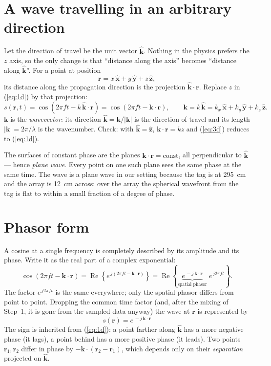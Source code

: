 \documentclass[11pt,a4paper]{article}
\newcommand{\vect}[1]{\mathbf{#1}}
\newcommand{\uv}[1]{\hat{\mathbf{#1}}}
\begin{document}
\section{A wave travelling in an arbitrary direction}
Let the direction of travel be the unit vector $\uv k$. Nothing in the physics prefers the $z$ axis, so the only change is that ``distance along the axis'' becomes ``distance along $\uv k$''. For a point at position
\[
  \vect r = x\,\uv x + y\,\uv y + z\,\uv z ,
\]
its distance along the propagation direction is the projection $\uv k\cdot\vect r$. Replace $z$ in (\ref{eq:1d}) by that projection:
\begin{equation}
  s(\vect r, t) = \cos\!\left(2\pi f t - k\,\uv k\cdot\vect r\right)
                = \cos\!\left(2\pi f t - \vect k\cdot\vect r\right),
  \qquad
  \vect k = k\,\uv k = k_x\,\uv x + k_y\,\uv y + k_z\,\uv z .
  \label{eq:3d}
\end{equation}
$\vect k$ is the \emph{wavevector}: its direction $\uv k = \vect k/|\vect k|$ is the direction of travel and its length $|\vect k| = 2\pi/\lambda$ is the wavenumber. Check: with $\uv k = \uv z$, $\vect k\cdot\vect r = kz$ and (\ref{eq:3d}) reduces to (\ref{eq:1d}).

The surfaces of constant phase are the planes $\vect k\cdot\vect r = \text{const}$, all perpendicular to $\uv k$ --- hence \emph{plane wave}. Every point on one such plane sees the same phase at the same time. The wave is a plane wave in our setting because the tag is at \SI{295}{cm} and the array is \SI{12}{cm} across: over the array the spherical wavefront from the tag is flat to within a small fraction of a degree of phase.

\section{Phasor form}
A cosine at a single frequency is completely described by its amplitude and its phase. Write it as the real part of a complex exponential:
\[
  \cos\!\left(2\pi f t - \vect k\cdot\vect r\right)
  = \operatorname{Re}\!\left\{ e^{\,j\left(2\pi f t - \vect k\cdot\vect r\right)} \right\}
  = \operatorname{Re}\!\left\{ \underbrace{e^{\,-j\,\vect k\cdot\vect r}}_{\text{spatial phasor}}\; e^{\,j 2\pi f t} \right\}.
\]
The factor $e^{\,j2\pi ft}$ is the same everywhere; only the spatial phasor differs from point to point. Dropping the common time factor (and, after the mixing of Step~1, it is gone from the sampled data anyway) the wave at $\vect r$ is represented by
\begin{equation}
  \boxed{\; s(\vect r) = e^{\,-j\,\vect k\cdot\vect r} \;}
  \label{eq:phasor}
\end{equation}
The sign is inherited from (\ref{eq:1d}): a point farther along $\uv k$ has a more negative phase (it lags), a point behind has a more positive phase (it leads). Two points $\vect r_1, \vect r_2$ differ in phase by $-\vect k\cdot(\vect r_2 - \vect r_1)$, which depends only on their \emph{separation} projected on $\uv k$.
\end{document}
